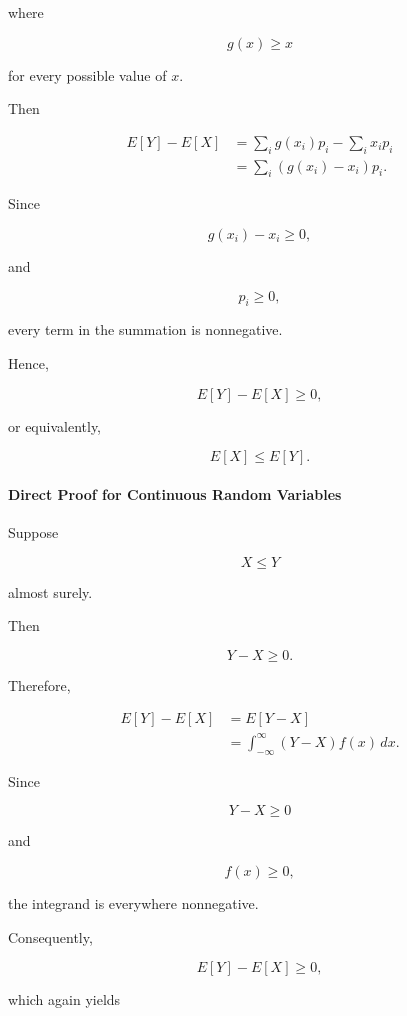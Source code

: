 \documentclass[11pt]{article}
\begin{document}
\begin{mdframed}[
		linewidth=0.8pt,
		roundcorner=6pt,
		backgroundcolor=gray!5,
		linecolor=gray!60,
		innertopmargin=10pt,
		innerbottommargin=10pt,
		innerleftmargin=10pt,
		innerrightmargin=10pt
		]
		where
		
		\[
		g(x)\ge x
		\]
		
		for every possible value of \(x\).
		
		Then
		
		\[
		\begin{aligned}
			E[Y]-E[X]
			&=
			\sum_i
			g(x_i)p_i
			-
			\sum_i
			x_ip_i
			\\[0.3cm]
			&=
			\sum_i
			(g(x_i)-x_i)p_i.
		\end{aligned}
		\]
		
		Since
		
		\[
		g(x_i)-x_i\ge0,
		\]
		
		and
		
		\[
		p_i\ge0,
		\]
		
		every term in the summation is nonnegative.
		
		Hence,
		
		\[
		E[Y]-E[X]\ge0,
		\]
		
		or equivalently,
		
		\[
		\boxed{
			E[X]\le E[Y].
		}
		\]
		
		\bigskip
		
		\paragraph{Direct Proof for Continuous Random Variables}
		
		Suppose
		
		\[
		X\le Y
		\]
		
		almost surely.
		
		Then
		
		\[
		Y-X\ge0.
		\]
		
		Therefore,
		
		\[
		\begin{aligned}
			E[Y]-E[X]
			&=
			E[Y-X]
			\\[0.3cm]
			&=
			\int_{-\infty}^{\infty}
			(Y-X)f(x)\,dx.
		\end{aligned}
		\]
		
		Since
		
		\[
		Y-X\ge0
		\]
		
		and
		
		\[
		f(x)\ge0,
		\]
		
		the integrand is everywhere nonnegative.
		
		Consequently,
		
		\[
		E[Y]-E[X]\ge0,
		\]
		
		which again yields
		

\end{mdframed}
\end{document}
